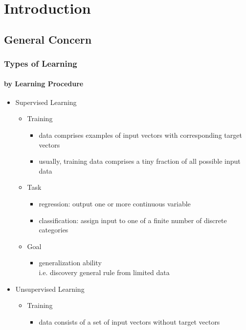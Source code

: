 \chapter{Introduction}

\section{General Concern}
\subsection{Types of Learning}

\subsubsection{by Learning Procedure}
\begin{itemize}
\item Supervised Learning
	\begin{itemize}
	\item Training
		\begin{itemize}
		\item data comprises examples of input vectors with corresponding target vectors
		\item usually, training data comprises a tiny fraction of all possible input data
		\end{itemize}
	\item Task
		\begin{itemize}
		\item regression: output one or more continuous variable
		\item classification: assign input to one of a finite number of discrete categories
		\end{itemize}
	\item Goal
		\begin{itemize}
		\item generalization ability \\
		i.e. discovery general rule from limited data
		\end{itemize}
	\end{itemize}
\item Unsupervised Learning
	\begin{itemize}
	\item Training
		\begin{itemize}
		\item data consists of a set of input vectors without target vectors
		\end{itemize}

\end{itemize}
\end{itemize}
